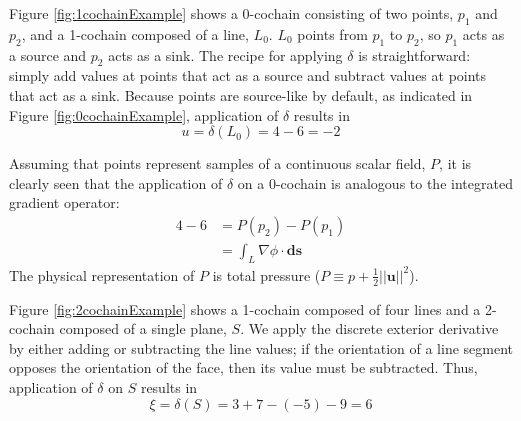 Figure \ref{fig:1cochainExample} shows a 0-cochain consisting of two points, $p_1$ and $p_2$, and a 1-cochain composed of a line, $L_0$. $L_0$ points from $p_1$ to $p_2$, so $p_1$ acts as a source and $p_2$ acts as a sink. The recipe for applying $\delta$ is straightforward: simply add values at points that act as a source and subtract values at points that act as a sink. Because points are source-like by default, as indicated in Figure \ref{fig:0cochainExample}, application of $\delta$ results in
\begin{equation}
    u = \delta(L_0) = 4 - 6 = -2
\end{equation}

Assuming that points represent samples of a continuous scalar field, $P$, it is clearly seen that the application of $\delta$ on a 0-cochain is analogous to the integrated gradient operator:
\begin{equation}
    \begin{split}
        4 - 6 &= P(p_2) - P(p_1) \\
        &= \int_{L} \nabla \phi \cdot \mathbf{ds}
    \end{split}
\end{equation}
The physical representation of $P$ is total pressure ($P \equiv p + \frac{1}{2}||\mathbf{u}||^2$).

Figure \ref{fig:2cochainExample} shows a 1-cochain composed of four lines and a 2-cochain composed of a single plane, $S$. We apply the discrete exterior derivative by either adding or subtracting the line values; if the orientation of a line segment opposes the orientation of the face, then its value must be subtracted. Thus, application of $\delta$ on $S$ results in
\begin{equation}
    \xi = \delta(S) = 3 + 7 - (-5) - 9 = 6
\end{equation}

